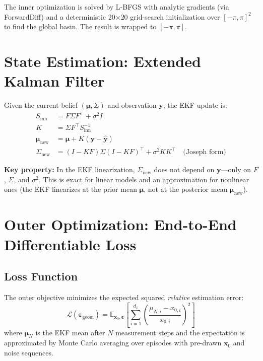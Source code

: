 \documentclass[11pt,a4paper]{article}
\begin{document}
The inner optimization is solved by L-BFGS with analytic gradients (via ForwardDiff) and a deterministic 20$\times$20 grid-search initialization over $[-\pi, \pi]^2$ to find the global basin.  The result is wrapped to $[-\pi, \pi]$.

\section{State Estimation: Extended Kalman Filter}

Given the current belief $(\bm{\mu}, \Sigma)$ and observation $\bm{y}$, the EKF update is:
\begin{align}
  S_{\text{inn}} &= F \Sigma F^\top + \sigma^2 I \\
  K &= \Sigma F^\top S_{\text{inn}}^{-1} \\
  \bm{\mu}_{\text{new}} &= \bm{\mu} + K(\bm{y} - \hat{\bm{y}}) \\
  \Sigma_{\text{new}} &= (I - KF) \Sigma (I - KF)^\top + \sigma^2 K K^\top \quad \text{(Joseph form)}
\end{align}

\textbf{Key property:} In the EKF linearization, $\Sigma_{\text{new}}$ does not depend on $\bm{y}$---only on $F$, $\Sigma$, and $\sigma^2$.  This is exact for linear models and an approximation for nonlinear ones (the EKF linearizes at the prior mean $\bm{\mu}$, not at the posterior mean $\bm{\mu}_{\text{new}}$).

\section{Outer Optimization: End-to-End Differentiable Loss}

\subsection{Loss Function}

The outer objective minimizes the expected squared \emph{relative} estimation error:
\[
  \mathcal{L}(\bm{\varepsilon}_{\text{geom}}) = \mathbb{E}_{\bm{x}_0, \bm{\varepsilon}} \left[ \sum_{i=1}^{d_x} \left(\frac{\mu_{N,i} - x_{0,i}}{x_{0,i}}\right)^2 \right]
\]
where $\bm{\mu}_N$ is the EKF mean after $N$ measurement steps and the expectation is approximated by Monte Carlo averaging over episodes with pre-drawn $\bm{x}_0$ and noise sequences.
\end{document}
